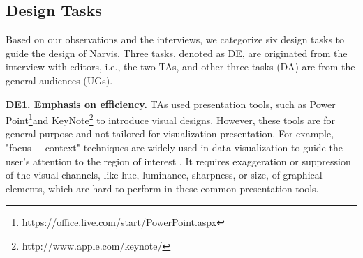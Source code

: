 \subsection{Design Tasks}
Based on our observations and the interviews, we categorize six design tasks to guide the design of Narvis. Three tasks, denoted as DE, are originated from the interview with editors, i.e., the two TAs, and other three tasks (DA) are from the general audiences (UGs).

\noindent
\textbf{DE1. Emphasis on  efficiency.}
TAs used presentation tools, such as Power Point\footnote{https://office.live.com/start/PowerPoint.aspx}and KeyNote\footnote{http://www.apple.com/keynote/} to introduce visual designs. However, these tools are for general purpose and not tailored for visualization presentation. 
For example, "focus + context" techniques are widely used in data visualization to guide the user’s attention to the region of interest \cite{doleisch2003interactive, kosara2002focus+}. It requires exaggeration or suppression of the visual channels, like hue, luminance, sharpness, or size, of graphical elements, which are hard to perform in these common presentation tools. 

